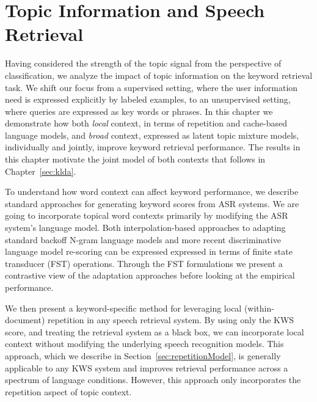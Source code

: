 \chapter{Topic Information and Speech Retrieval}
\label{sec:retrieval1}
\label{sec:repetitionRetrieval}
\label{sec:topicLMsRetrieval}


Having considered the strength of the topic signal from the perspective of classification, we analyze the impact of topic information on the keyword retrieval task.  We shift our focus from a supervised setting, where the user information need is expressed explicitly by labeled examples, to an unsupervised setting, where queries are expressed as key words or phrases.  In this chapter we demonstrate how both \textit{local} context, in terms of repetition and cache-based language models, and \textit{broad} context, expressed as latent topic mixture models, individually and jointly, improve keyword retrieval performance.  The results in this chapter motivate the joint model of both contexts that follows in Chapter~\ref{sec:klda}.

To understand how word context can affect keyword performance, we describe standard approaches for generating keyword scores from ASR systems.  We are going to incorporate topical word contexts primarily by modifying the ASR system's language model.  Both interpolation-based approaches to adapting standard backoff N-gram language models and more recent discriminative language model re-scoring can be expressed expressed in terms of finite state transducer (FST) operations.  Through the FST formulations we present a contrastive view of the adaptation approaches before looking at the empirical performance.

We then present a keyword-specific method for leveraging local (within-document) repetition in any speech retrieval system.  By using only the KWS score, and treating the retrieval system as a black box, we can incorporate local context without modifying the underlying speech recognition models.  This approach, which we describe in Section~\ref{sec:repetitionModel}, is generally applicable to any KWS system and improves retrieval performance across a spectrum of language conditions.  However, this approach only incorporates the repetition aspect of topic context.

